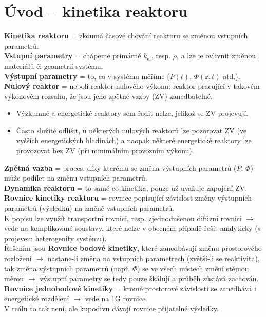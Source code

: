 \section{Úvod -- kinetika reaktoru}

\textbf{Kinetika reaktoru} = zkoumá časové chování reaktoru se změnou vstupních parametrů.\\

\textbf{Vstupní parametry} = chápeme primárně $k_{\text{ef}}$, resp. $\rho$, a lze je ovlivnit změnou materiálů či geometrií systému.\\

\textbf{Výstupní parametry} = to, co v systému měříme ($P(t)$, $\Phi (\textbf{r}, t) $ atd.).\\

\textbf{Nulový reaktor} = neboli reaktor nulového výkonu; reaktor pracující v takovém výkonovém rozsahu, že jsou jeho zpětné vazby (ZV) zanedbatelné.

\begin{itemize}
  \item Výzkumné a energetické reaktory sem řadit nelze, jelikož se ZV projevují.
  \item Často složité odlišit, u některých nulových reaktorů lze pozorovat ZV (ve vyšších energetických hladinách) a naopak některé energetické reaktory lze provozovat bez ZV (při minimálním provozním výkonu).
\end{itemize}

\textbf{Zpětná vazba} = proces, díky kterému se změna výstupních parametrů ($P$, $\Phi$) může podílet na změnu vstupních parametrů.\\

\textbf{Dynamika reaktoru} = to samé co kinetika, pouze už uvažuje zapojení ZV.\\

\textbf{Rovnice kinetiky reaktoru} = rovnice popisující závislost změny výstupních parametrů (výsledků) na změně vstupních parametrů.\\

K popisu lze využít transportní rovnici, resp. zjednodušenou difúzní rovnici $\rightarrow$ vede na komplikované soustavy, které nelze v obecném případě řešit analyticky (s projevem heterogenity systému).\\

Řešením jsou \textbf{Rovnice bodové kinetiky}, které zanedbávají změnu prostorového rozložení $\rightarrow$ nastane-li změna na vstupních parametrech (zvětší-li se reaktivita), tak změna výstupních parametrů (např. $\Phi$) se ve všech místech změní stějnou měrou $\rightarrow$ výstupní parametry se tedy pouze škálují a průběh zůstává zachován.\\

\textbf{Rovnice jednobodové kinetiky} = kromě prostorové závislosti se zanedbává i energetické rozdělení $\rightarrow$ vede na 1G rovnice.\\

V reálu to tak není, ale kupodivu dávají rovnice přijatelné výsledky.
